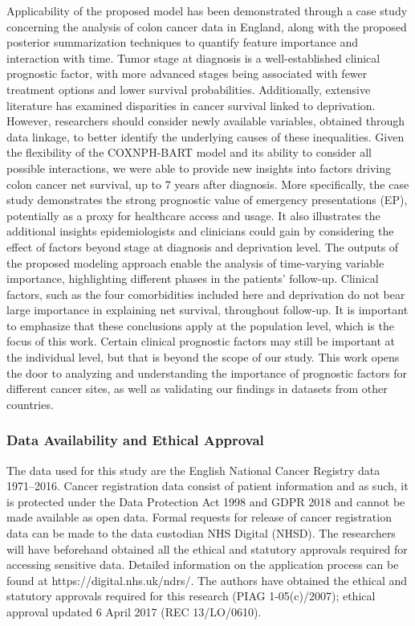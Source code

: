 \documentclass[12pt]{article}
\begin{document}
Applicability of the proposed model has been demonstrated through a case study concerning the analysis of colon cancer data in England, along with the proposed posterior summarization techniques to quantify feature importance and interaction with time. Tumor stage at diagnosis is a well-established clinical prognostic factor, with more advanced stages being associated with fewer treatment options and lower survival probabilities. Additionally, extensive literature has examined disparities in cancer survival linked to deprivation. However, researchers should consider newly available variables, obtained through data linkage, to better identify the underlying causes of these inequalities. Given the flexibility of the COXNPH-BART model and its ability to consider all possible interactions, we were able to provide new insights into factors driving colon cancer net survival, up to 7 years after diagnosis. More specifically, the case study demonstrates the strong prognostic value of emergency presentations (EP), potentially as a proxy for healthcare access and usage. It also illustrates the additional insights epidemiologists and clinicians could gain by considering the effect of factors beyond stage at diagnosis and deprivation level. The outputs of the proposed modeling approach enable the analysis of time-varying variable importance, highlighting different phases in the patients' follow-up. Clinical factors, such as the four comorbidities included here and deprivation do not bear large importance in explaining net survival, throughout follow-up. It is important to emphasize that these conclusions apply at the population level, which is the focus of this work. Certain clinical prognostic factors may still be important at the individual level, but that is beyond the scope of our study. This work opens the door to analyzing and understanding the importance of prognostic factors for different cancer sites, as well as validating our findings in datasets from other countries.

\subsubsection*{Data Availability and Ethical Approval}

The data used for this study are the English National Cancer Registry data 1971–2016. Cancer registration data consist of patient information and as such, it is protected under the Data Protection Act 1998 and GDPR 2018 and cannot be made available as open data. Formal requests for release of cancer registration data can be made to the data custodian NHS Digital (NHSD). The researchers will have beforehand obtained all the ethical and statutory approvals required for accessing sensitive data. Detailed information on the application process can be found at https://digital.nhs.uk/ndrs/. The authors have obtained the ethical and statutory approvals required for this research (PIAG 1-05(c)/2007); ethical approval updated 6 April 2017 (REC 13/LO/0610).
\end{document}
